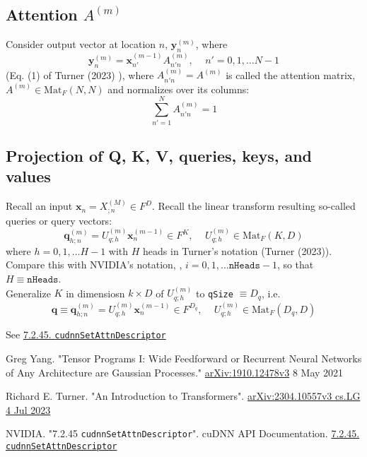 \documentclass[10pt]{amsart}
\begin{document}
\begin{multicols*}{2}
\subsection{Attention $A^{(m)}$ }

Consider output vector at location $n$, $\mathbf{y}_n^{(m)}$, where 
\begin{equation}
\mathbf{y}_n^{(m)} = \mathbf{x}^{(m -1)}_{n'} A^{(m)}_{n' n}, \quad \, n' = 0,1, \dots N-1
\end{equation} 
(Eq. (1) of Turner (2023) \cite{Turn2023}), where $A^{(m)}_{n' n} = A^{(m)}$ is called the attention matrix, $A^{(m)} \in \text{Mat}_F(N, N)$ and normalizes over its columns:
\begin{equation}
\sum_{n' = 1}^N A^{(m)}_{n' n}  =1
\end{equation}

\subsection{Projection of Q, K, V, queries, keys, and values}

Recall an input $\mathbf{x}_n = X^{(M)}_{;n} \in F^D$. Recall the linear transform resulting so-called queries or query vectors:
\[
\mathbf{q}^{(m)}_{h; n} = U^{(m)}_{q;h} \mathbf{x}^{(m-1)}_n \in F^K, \quad \, U^{(m)}_{q; h} \in \text{Mat}_F(K, D)
\]
where $h=0,1,\dots H-1$ with $H$ heads in Turner's notation (Turner (2023)\cite{Turn2023}). Compare this with NVIDIA's notation, \cite{NSAtn2023}, $i=0,1,\dots \texttt{nHeads} - 1$, so that $H \equiv \texttt{nHeads}$.\\

Generalize $K$ in dimensiosn $k\times D$ of $U^{(m)}_{q;h}$ to \texttt{qSize} $\equiv D_q$, i.e.
\[
\mathbf{q} \equiv \mathbf{q}^{(m)}_{h ; n} = U^{(m)}_{q;h} \mathbf{x}_n^{(m-1)} \in F^{D_q}, \quad \,  U^{(m)}_{q;h} \in \text{Mat}_F(D_q, D)
\] 

See \href{https://docs.nvidia.com/deeplearning/cudnn/api/index.html#cudnnSetAttnDescriptor}{7.2.45. \texttt{cudnnSetAttnDescriptor}}

\end{multicols*}

\begin{thebibliography}{9}

Greg Yang. "Tensor Programs I: Wide Feedforward or Recurrent Neural Networks of Any Architecture are Gaussian Processes." \href{https://arxiv.org/pdf/1910.12478.pdf}{arXiv:1910.12478v3} 8 May 2021

Richard E. Turner. "An Introduction to Transformers". \href{https://arxiv.org/pdf/2304.10557.pdf}{arXiv:2304.10557v3 cs.LG 4 Jul 2023}

NVIDIA. "7.2.45 \texttt{cudnnSetAttnDescriptor}". cuDNN API Documentation. \href{https://docs.nvidia.com/deeplearning/cudnn/api/index.html#cudnnSetAttnDescriptor}{7.2.45. \texttt{cudnnSetAttnDescriptor}}

\end{thebibliography}
\end{document}
